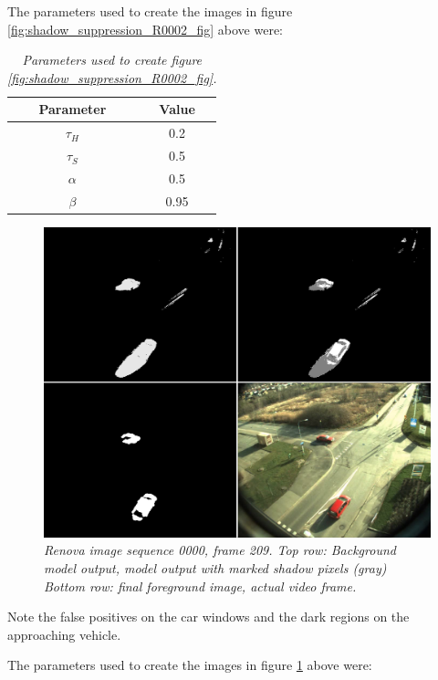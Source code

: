 The parameters used to create the images in figure \ref{fig:shadow_suppression_R0002_fig} above were:

\begin{table}[h]
\centering
\begin{tabular}{|c|c|}
	\hline
	Parameter & Value  \\
	\hline
	$\tau_H$ &  0.2 \\
	\hline
	$\tau_S$ & 0.5 \\
	\hline
	$\alpha$ &  0.5 \\
	\hline
	$\beta$ &  0.95 \\
	\hline
\end{tabular}
\caption{\textit{Parameters used to create figure \ref{fig:shadow_suppression_R0002_fig}.}}
\label{tab:shadow_parameters_R0002_fig}
\end{table}

\newpage
\begin{figure}[htb]
	\centering
	\includegraphics[width=\linewidth]{images/ShadowRenova0000.png}
	\caption{\textit{Renova image sequence 0000, frame 209. 
	\newline
	Top row: Background model output, model output with marked shadow pixels (gray)
	\newline
	Bottom row: final foreground image, actual video frame.}}
	\label{fig:shadow_suppression_R0000_fig}  %
\end{figure}
Note the false positives on the car windows and the dark regions on the approaching vehicle.

The parameters used to create the images in figure \ref{fig:shadow_suppression_R0000_fig} above were:

